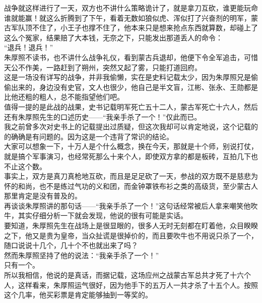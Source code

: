 \begin{multicols}{\theparacolNo}
战争就这样进行了一天，双方也不讲什么策略诡计了，就是拿刀互砍，谁更能玩命谁就能赢！就这么折腾到了下午，看着无数如狼似虎、浑似打了兴奋剂的明军，蒙古军队顶不住了，小王子也撑不住了，他本来只是想来抢点东西就算数，却碰上了这么个冤家，结果赔了大本钱，无奈之下，只能发出那道丢人的命令：\\

“退兵！退兵！”\\

朱厚照不读书，也不讲什么战争礼仪，看到蒙古兵退却，他便下令全军追击，可惜天公不作美，一路赶到了朔州，突然又起了雾，只能打道回府。\\

这是一场没有详写的战争，并非我偷懒，实在是史料记载太少，因为朱厚照兄是偷偷出来的，身边没有史官，文人也很少，他自己是半文盲，江彬、张永、王勋都是比他还粗的粗人，总不能指望他们吧。\\

值得一提的是此战的战果，史书记载明军死亡五十二人，蒙古军死亡十六人，然后还有朱厚照先生的口述历史——“我亲手杀了一个！”仅此而已。\\

我之前曾多次对史书上的记载提出过质疑，但这次我却可以肯定地说，这个记载的的确确是有问题的。因为这是一个违背了常识的结论。\\

大家可以想象一下，十万人是个什么概念，换在今天，那就是十个师，别说打仗，就是搞个军事演习，也经常死那么十来个人，即使双方拿的都是板砖，互拍几下也不止这个数。\\

事实上，双方是真刀真枪地互砍，而且是足足砍了一天，参战的双方既不是慈悲为怀的和尚，也不是练过气功的义和团，而金钟罩铁布衫之类的高级货，至少蒙古人那里肯定是没有普及的。\\

再谈谈朱厚照讲的那句话——“我亲手杀了一个！”这句话经常被后人拿来嘲笑他吹牛，其实仔细分析一下就会发现，他说的很有可能是实话。\\

要知道，朱厚照先生在战场上是很显眼的，很多人无时无刻都在盯着他，众目睽睽之下，他又是贵为皇帝，当众扯谎是很掉价的，而且要吹牛也不用说只杀了一个，随口说说十几个，几十个不也就出来了吗？\\

然而朱厚照坚持了他的说法：“我亲手杀了一个！”\\

只有一个。\\

所以我相信，他说的是真话，而据记载，这场应州之战蒙古军总共才死了十六个人，这样看来，朱厚照运气很好，因为他手下的五万人一共才杀了十五个人。按照这个几率，他买彩票是肯定能够抽到一等奖的。\\


\end{multicols}
